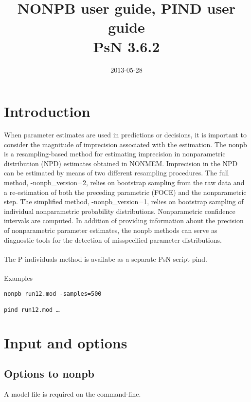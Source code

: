 \documentclass[a4paper,12pt]{article}
\title{NONPB user guide, PIND user guide\\ \vspace{2 mm} {\large PsN 3.6.2}}
\date{2013-05-28}
\begin{document}
\maketitle


\section{Introduction}

When parameter estimates are used in predictions or decisions, it is important to consider the magnitude of imprecision associated with the estimation. The nonpb\cite{Baverel} is a resampling-based method for estimating imprecision in nonparametric distribution (NPD) estimates obtained in NONMEM. Imprecision in the NPD can be estimated by means of two different resampling procedures. The full method, -nonpb\_version=2, relies on bootstrap sampling from the raw data and a re-estimation of both the preceding parametric (FOCE) and the nonparametric step. The simplified method, -nonpb\_version=1, relies on bootstrap sampling of individual nonparametric probability distributions. Nonparametric confidence intervals are computed. In addition of providing information about the precision of nonparametric parameter estimates, the nonpb methods can serve as diagnostic tools for the detection of misspecified parameter distributions.
\\
\\
The P individuals method is availabe as a separate PsN script pind.
\\
\\
Examples
\begin{verbatim}
nonpb run12.mod -samples=500

pind run12.mod …
\end{verbatim}

\section{Input and options}

\subsection{Options to nonpb}

A model file is required on the command-line.
\end{document}
